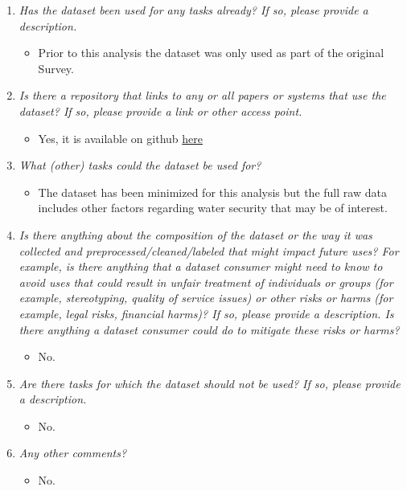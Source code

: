 \documentclass[
]{article}
\providecommand{\tightlist}{%
  \setlength{\itemsep}{0pt}\setlength{\parskip}{0pt}}
\begin{document}
\begin{enumerate}
\def\labelenumi{\arabic{enumi}.}
\tightlist
\item
  \emph{Has the dataset been used for any tasks already? If so, please provide a description.}

  \begin{itemize}
  \tightlist
  \item
    Prior to this analysis the dataset was only used as part of the original Survey.
  \end{itemize}
\item
  \emph{Is there a repository that links to any or all papers or systems that use the dataset? If so, please provide a link or other access point.}

  \begin{itemize}
  \tightlist
  \item
    Yes, it is available on github \href{https://github.com/Jon-Goodwin/Final}{here}
  \end{itemize}
\item
  \emph{What (other) tasks could the dataset be used for?}

  \begin{itemize}
  \tightlist
  \item
    The dataset has been minimized for this analysis but the full raw data includes other factors regarding water security that may be of interest.
  \end{itemize}
\item
  \emph{Is there anything about the composition of the dataset or the way it was collected and preprocessed/cleaned/labeled that might impact future uses? For example, is there anything that a dataset consumer might need to know to avoid uses that could result in unfair treatment of individuals or groups (for example, stereotyping, quality of service issues) or other risks or harms (for example, legal risks, financial harms)? If so, please provide a description. Is there anything a dataset consumer could do to mitigate these risks or harms?}

  \begin{itemize}
  \tightlist
  \item
    No.
  \end{itemize}
\item
  \emph{Are there tasks for which the dataset should not be used? If so, please provide a description.}

  \begin{itemize}
  \tightlist
  \item
    No.
  \end{itemize}
\item
  \emph{Any other comments?}

  \begin{itemize}
  \tightlist
  \item
    No.
  \end{itemize}
\end{enumerate}
\end{document}

